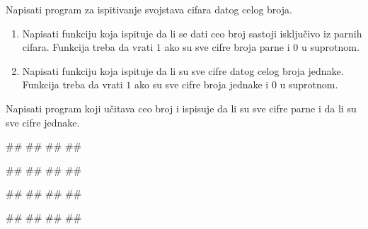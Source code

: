 \begin{Exercise}[label=v1.4_10] 
Napisati program za ispitivanje svojstava cifara datog celog broja.
\begin{enumerate}
\item Napisati funkciju  koja ispituje da li
  se dati ceo broj sastoji isključivo iz parnih cifara. Funkcija treba
  da vrati $1$ ako su sve cifre broja parne i $0$ u suprotnom.
\item Napisati funkciju  koja ispituje da
  li su sve cifre datog celog broja jednake. Funkcija treba da vrati $1$
  ako su sve cifre broja jednake i $0$ u suprotnom.
\end{enumerate}
Napisati program koji učitava ceo broj i ispisuje da li su sve cifre
parne i da li su sve cifre jednake.

\begin{miditest}
\begin{upotreba}{1}
#\naslovInt#
##
##
##
\end{upotreba}
\end{miditest}
\begin{miditest}
\begin{upotreba}{2}
#\naslovInt#
##
##
##
\end{upotreba}
\end{miditest}

\begin{miditest}
\begin{upotreba}{3}
#\naslovInt#
##
##
##
\end{upotreba}
\end{miditest}
\begin{miditest}
\begin{upotreba}{4}
#\naslovInt#
##
##
##
\end{upotreba}
\end{miditest}

\end{Exercise}
\ifresenja 
\begin{Answer}[ref=v1.4_10]
\end{Answer} 
\fi





